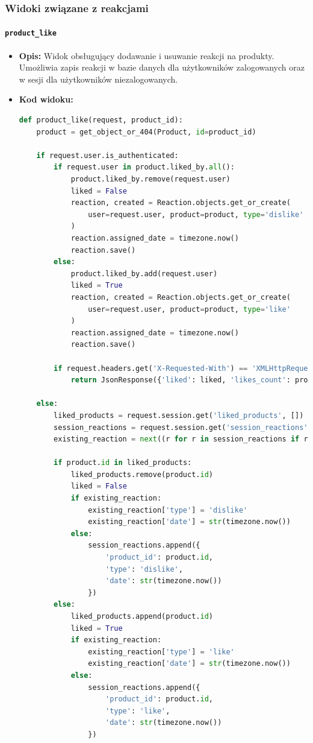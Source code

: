 \documentclass[12pt,a4paper,oneside]{article}
\theoremstyle{definition}
\numberwithin{equation}{section}
\begin{document}
\clearpage
\subsubsection{Widoki związane z reakcjami}
\paragraph{\texttt{product\_like}}
\begin{itemize}
    \item \textbf{Opis:} Widok obsługujący dodawanie i usuwanie reakcji na produkty. Umożliwia zapis reakcji w bazie danych dla użytkowników zalogowanych oraz w sesji dla użytkowników niezalogowanych.
    \item \textbf{Kod widoku:}
    \begin{lstlisting}[language=Python, caption=Widok \texttt{product\_like}]
def product_like(request, product_id):
    product = get_object_or_404(Product, id=product_id)

    if request.user.is_authenticated:
        if request.user in product.liked_by.all():
            product.liked_by.remove(request.user)
            liked = False
            reaction, created = Reaction.objects.get_or_create(
                user=request.user, product=product, type='dislike'
            )
            reaction.assigned_date = timezone.now()
            reaction.save()
        else:
            product.liked_by.add(request.user)
            liked = True
            reaction, created = Reaction.objects.get_or_create(
                user=request.user, product=product, type='like'
            )
            reaction.assigned_date = timezone.now()
            reaction.save()

        if request.headers.get('X-Requested-With') == 'XMLHttpRequest':
            return JsonResponse({'liked': liked, 'likes_count': product.liked_by.count()})

    else:
        liked_products = request.session.get('liked_products', [])
        session_reactions = request.session.get('session_reactions', [])
        existing_reaction = next((r for r in session_reactions if r['product_id'] == product.id), None)

        if product.id in liked_products:
            liked_products.remove(product.id)
            liked = False
            if existing_reaction:
                existing_reaction['type'] = 'dislike'
                existing_reaction['date'] = str(timezone.now())
            else:
                session_reactions.append({
                    'product_id': product.id,
                    'type': 'dislike',
                    'date': str(timezone.now())
                })
        else:
            liked_products.append(product.id)
            liked = True
            if existing_reaction:
                existing_reaction['type'] = 'like'
                existing_reaction['date'] = str(timezone.now())
            else:
                session_reactions.append({
                    'product_id': product.id,
                    'type': 'like',
                    'date': str(timezone.now())
                })


\end{lstlisting}
\end{itemize}
\end{document}
